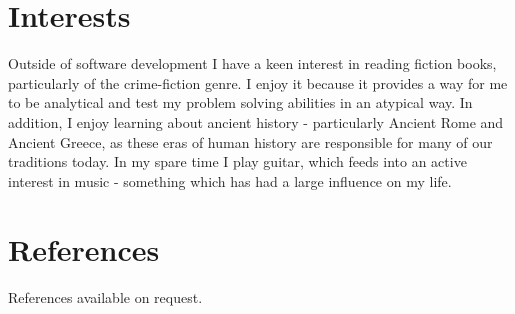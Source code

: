 \documentclass[11pt]{article}
\begin{document}
\section*{Interests}
Outside of software development I have a keen interest in reading fiction books, particularly of the crime-fiction genre. I enjoy it because it provides a way for me to be analytical and test my problem solving abilities in an atypical way. In addition, I enjoy learning about ancient history - particularly Ancient Rome and Ancient Greece, as these eras of human history are responsible for many of our traditions today. In my spare time I play guitar, which feeds into an active interest in music - something which has had a large influence on my life.


\section*{References}
References available on request.

\end{document}
